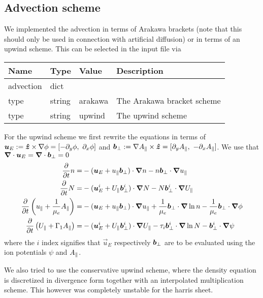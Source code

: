 \subsection{Advection scheme}
We implemented the advection in terms of Arakawa brackets
(note that this should only be used in connection with artificial diffusion)
or in terms of an upwind scheme.
This can be selected in the input file via
\begin{longtable}{llll}
\toprule
\rowcolor{gray!50}\textbf{Name} &  \textbf{Type} & \textbf{Value}  & \textbf{Description}  \\ \midrule
advection & dict & & \\
\qquad type & string & arakawa & The Arakawa bracket scheme \\
\qquad type & string & upwind  & The upwind scheme \\
\bottomrule
\end{longtable}
For the upwind scheme we first rewrite the equations in terms of
${\boldsymbol{u}}_E := \bm{\hat{z}} \times \nabla\phi = [-\partial_y \phi,\ \partial_x \phi]$ and
$ {\boldsymbol{b}}_\perp := \nabla A_\parallel \times \bm{\hat{z}} = [\partial_y A_\parallel,\ -\partial_x A_\parallel]$. We use
that ${\boldsymbol{\nabla}}\cdot {\boldsymbol{u}}_E = {\boldsymbol{\nabla}}\cdot  {\boldsymbol{b}}_\perp =0$
\begin{align}
\frac{\partial}{\partial t} n  =&
- ( {\boldsymbol{u}}_E + u_\parallel  {\boldsymbol{b}}_\perp)\cdot{\boldsymbol{\nabla}} n  - n   {\boldsymbol{b}}_\perp \cdot{\boldsymbol{\nabla}}  u_\parallel
\\
\frac{\partial}{\partial t} N =&
- ( {\boldsymbol{u}}_E^i + U_\parallel  {\boldsymbol{b}}_\perp^i)\cdot{\boldsymbol{\nabla}} N - N  {\boldsymbol{b}}_\perp^i\cdot{\boldsymbol{\nabla}}  U_\parallel
 \\
\frac{\partial}{\partial t} \left( u_\parallel+ \frac{1}{\mu_e} A_\parallel \right) =&
-  ({\boldsymbol{u}}_E + u_\parallel  {\boldsymbol{b}}_\perp ) \cdot{\boldsymbol{\nabla}} u_\parallel
+ \frac{1}{\mu_e}  {\boldsymbol{b}}_\perp \cdot{\boldsymbol{\nabla}} \ln n 
- \frac{1}{\mu_e}  {\boldsymbol{b}}_\perp \cdot{\boldsymbol{\nabla}} \phi
      \\
      \frac{\partial}{\partial t} \left( U_\parallel+ \Gamma_1 A_\parallel  \right) =&
    - ({\boldsymbol{u}}_E^i + U_\parallel  {\boldsymbol{b}}_\perp^i ) \cdot{\boldsymbol{\nabla}} U_\parallel
    - \tau_i  {\boldsymbol{b}}_\perp^i \cdot{\boldsymbol{\nabla}} \ln N
    -  {\boldsymbol{b}}_\perp^i \cdot{\boldsymbol{\nabla}} \psi
\end{align}
where the $i$ index signifies that $\vec u_E$ respectively $ {\boldsymbol{b}}_\perp$ are to
be evaluated using the ion potentials $\psi$ and $A_\parallel$.
\begin{tcolorbox}[title=Note]
    We also tried to use the conservative upwind scheme, where the density equation
    is discretized in divergence form together with an interpolated multiplication
    scheme. This however was completely unstable for the harris sheet.
\end{tcolorbox}
